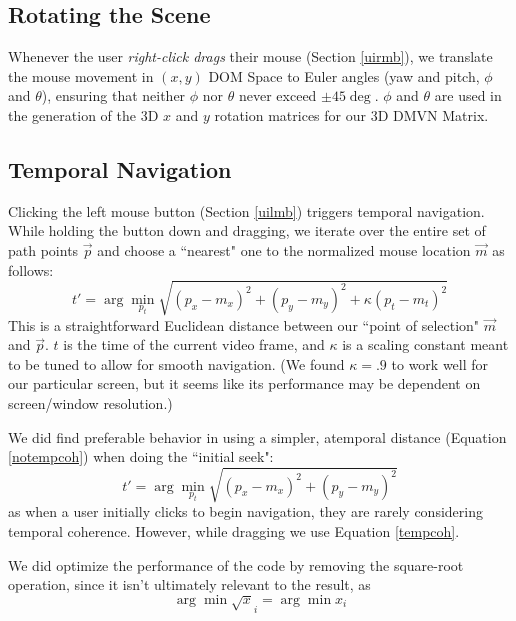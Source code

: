 \subsection{Rotating the Scene}
Whenever the user \emph{right-click drags} their mouse (Section \ref{uirmb}), we translate the mouse movement in $(x,y)$ DOM Space to Euler angles (yaw and pitch, $\phi$ and $\theta$), ensuring that neither $\phi$ nor $\theta$ never exceed $\pm45\deg$. $\phi$ and $\theta$ are used in the generation of the 3D $x$ and $y$ rotation matrices for our 3D DMVN Matrix.

\subsection{Temporal Navigation}
\label{temporalnav}
Clicking the left mouse button (Section \ref{uilmb}) triggers temporal navigation. While holding the button down and dragging, we iterate over the entire set of path points $\vec{p}$ and choose a ``nearest" one to the normalized mouse location $\vec{m}$ as follows:
\begin{equation}
\label{tempcoh}
    t'= \arg \min_{p_t} \sqrt{(p_x-m_x)^2 + (p_y-m_y)^2 + \kappa (p_t - m_t)^2}
\end{equation}
This is a straightforward Euclidean distance between our ``point of selection" $\vec{m}$ and $\vec{p}$. $t$ is the time of the current video frame, and $\kappa$ is a scaling constant meant to be tuned to allow for smooth navigation. (We found $\kappa=.9$ to work well for our particular screen, but it seems like its performance may be dependent on screen/window resolution.)
\par We did find preferable behavior in using a simpler, atemporal distance (Equation \ref{notempcoh}) when doing the ``initial seek":
\begin{equation}
\label{notempcoh}
    t'= \arg \min_{p_t} \sqrt{(p_x-m_x)^2 + (p_y-m_y)^2}
\end{equation}
as when a user initially clicks to begin navigation, they are rarely considering temporal coherence. However, while dragging we use Equation \ref{tempcoh}.
\par We did optimize the performance of the code by removing the square-root operation, since it isn't ultimately relevant to the result, as
\begin{equation}
    \arg \min \sqrt x_i = \arg \min x_i
\end{equation}




